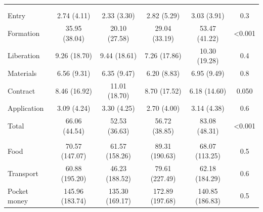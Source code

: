 \documentclass[
  11pt,
a4paper
]{report}
\begin{document}
\begin{table}[H]
{\begin{threeparttable}
\begin{tabular}[t]{lccccc}
\addlinespace[0.3em]
\hline
\multicolumn{6}{l}{\textbf{Firm survey:}}\\
\addlinespace[0.3em]
\multicolumn{6}{l}{\hspace{1em} Fees}\\
\hspace{1em}\hspace{1em}Entry & 2.74 (4.11) & 2.33 (3.30) & 2.82 (5.29) & 3.03 (3.91) & 0.3\\
\hspace{1em}\hspace{1em}Formation & 35.95 (38.04) & 20.10 (27.58) & 29.04 (33.19) & 53.47 (41.22) & <0.001\\
\hspace{1em}\hspace{1em}Liberation & 9.26 (18.70) & 9.44 (18.61) & 7.26 (17.86) & 10.30 (19.28) & 0.4\\
\hspace{1em}\hspace{1em}Materials & 6.56 (9.31) & 6.35 (9.47) & 6.20 (8.83) & 6.95 (9.49) & 0.8\\
\hspace{1em}\hspace{1em}Contract & 8.46 (16.92) & 11.01 (18.70) & 8.70 (17.52) & 6.18 (14.60) & 0.050\\
\hspace{1em}\hspace{1em}Application & 3.09 (4.24) & 3.30 (4.25) & 2.70 (4.00) & 3.14 (4.38) & 0.6\\
\hspace{1em}\hspace{1em}Total & 66.06 (44.54) & 52.53 (36.63) & 56.72 (38.85) & 83.08 (48.31) & <0.001\\
\addlinespace[0.3em]
\multicolumn{6}{l}{\hspace{1em} Allowances}\\
\hspace{1em}\hspace{1em}Food & 70.57 (147.07) & 61.57 (158.26) & 89.31 (190.63) & 68.07 (113.25) & 0.5\\
\hspace{1em}\hspace{1em}Transport & 60.88 (195.20) & 46.23 (188.52) & 79.61 (227.49) & 62.18 (184.29) & 0.6\\
\hspace{1em}\hspace{1em}Pocket money & 145.96 (183.74) & 135.30 (169.17) & 172.89 (197.68) & 140.85 (186.83) & 0.5\\

\end{tabular}
\end{threeparttable}}
\end{table}
\end{document}
